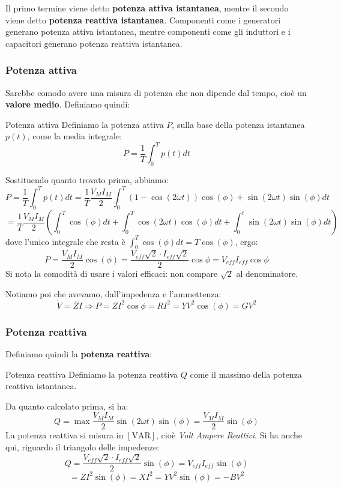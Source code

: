 \documentclass[a4paper,11pt]{article}
\begin{document}
Il primo termine viene detto \textbf{potenza attiva istantanea}, mentre il secondo viene detto \textbf{potenza reattiva istantanea}.
Componenti come i generatori generano potenza attiva istantanea, mentre componenti come gli induttori e i capacitori generano potenza reattiva istantanea.

\subsubsection{Potenza attiva}
Sarebbe comodo avere una misura di potenza che non dipende dal tempo, cioè un \textbf{valore medio}.
Definiamo quindi:
\begin{definition}{Potenza attiva}
	Definiamo la potenza attiva $P$, sulla base della potenza istantanea $p(t)$, come la media integrale:
	$$
		P = \frac{1}{T} \int_0^T p(t) dt
	$$
\end{definition}

Sostituendo quanto trovato prima, abbiamo:
$$
P = \frac{1}{T} \int_0^T p(t) dt = \frac{1}{T} \frac{V_M I_M}{2} \int_0^T \left( 1 - \cos(2\omega t) \right) \cos(\phi) +  \sin(2\omega t)\sin(\phi)  dt
$$
$$
= \frac{1}{T} \frac{V_M I_M}{2} \left( \int_0^T \cos(\phi) dt + \int_0^T \cos(2\omega t) \cos(\phi) dt + \int_0^t \sin(2\omega t)\sin(\phi)  dt \right) 
$$
dove l'unico integrale che resta è $\int_0^T \cos(\phi) dt = T \cos(\phi)$, ergo: 
$$
P= \frac{V_M I_M}{2} \cos(\phi) = \frac{V_{eff} \sqrt{2} \cdot I_{eff} \sqrt{2}}{2} \cos{\phi} = V_{eff}I_{eff} \cos{\phi}
$$
Si nota la comodità di usare i valori efficaci: non compare $\sqrt{2}$ al denominatore.

Notiamo poi che avevamo, dall'impedenza e l'ammettenza:
$$
\dot V = \bar{Z} \dot{I}  \Rightarrow P = Z I^2 \cos{\phi} = R I^2 = Y V^2 \cos(\phi) = G V^2 
$$

\subsubsection{Potenza reattiva}
Definiamo quindi la \textbf{potenza reattiva}:
\begin{definition}{Potenza reattiva}
	Definiamo la potenza reattiva $Q$ come il massimo della potenza reattiva istantanea.
\end{definition}

Da quanto calcolato prima, si ha:
$$
Q = \max{\frac{V_M I_M}{2} \sin(2\omega t)\sin(\phi)} = \frac{V_M I_M}{2} \sin(\phi)
$$
La potenza reattiva si misura in $[\mathrm{VAR}]$, cioè \textit{Volt Ampere Reattivi}.
Si ha anche qui, riguardo il triangolo delle impedenze:
$$
Q = \frac{V_{eff} \sqrt{2} \cdot I_{eff} \sqrt{2}}{2} \sin(\phi) = V_{eff}I_{eff} \sin(\phi) 
$$
$$
= ZI^2 \sin(\phi)= XI^2 = YV^2 \sin(\phi) = - BV^2
$$
\end{document}
